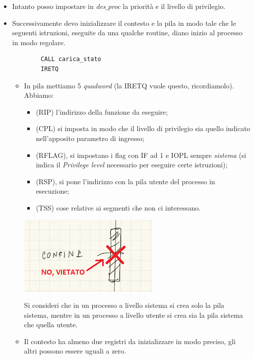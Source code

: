 \begin{itemize}
	\item Intanto posso impostare in \emph{des$\_$proc} la priorità e il livello di privilegio.
	\item Successivamente devo inizializzare il contesto e la pila in modo tale che le seguenti istruzioni, eseguite da una qualche routine, diano inizio al processo in modo regolare.
	\begin{verbatim}
		CALL carica_stato
		IRETQ
	\end{verbatim}
	\begin{itemize}
		\item In pila mettiamo 5 \emph{quadword} (la IRETQ vuole questo, ricordiamolo). Abbiamo:
		\begin{multicols}{2}
			\begin{itemize}
				\item (RIP) l'indirizzo della funzione da eseguire;
				\item (CPL) si imposta in modo che il livello di privilegio sia quello indicato nell'apposito parametro di ingresso;
				\item (RFLAG), si impostano i flag con IF ad 1 e IOPL sempre \textit{sistema} (si indica il \emph{Privilege level} necessario per eseguire certe istruzioni);
				\item (RSP), si pone l'indirizzo con la pila utente del processo in esecuzione;
				\item (TSS) cose relative ai segmenti che non ci interessano.
			\end{itemize}
			\columnbreak
			\begin{center}
				\includegraphics[scale=.8]{img/283.PNG}
			\end{center}
		\end{multicols}
		Si consideri che in un processo a livello sistema si crea solo la pila sistema, mentre in un processo a livello utente si crea sia la pila sistema che quella utente.
		\item Il contesto ha almeno due registri da inizializzare in modo preciso, gli altri possono essere uguali a zero.
		\begin{itemize}

\end{itemize}
\end{itemize}
\end{itemize}
